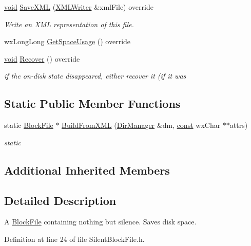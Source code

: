 \begin{DoxyCompactItemize}
\hyperlink{sound_8c_ae35f5844602719cf66324f4de2a658b3}{void} \hyperlink{class_silent_block_file_a9736f23cb10b2270b12064a9c37524b9}{Save\+X\+ML} (\hyperlink{class_x_m_l_writer}{X\+M\+L\+Writer} \&xml\+File) override
\begin{DoxyCompactList}\small\item\em Write an X\+ML representation of this file. \end{DoxyCompactList}\item 
wx\+Long\+Long \hyperlink{class_silent_block_file_a5273837f55e3a5ca86c17a6496015a91}{Get\+Space\+Usage} () override
\item 
\hyperlink{sound_8c_ae35f5844602719cf66324f4de2a658b3}{void} \hyperlink{class_silent_block_file_afbae18ac108b8555c5bfa42f1b99b4d2}{Recover} () override
\begin{DoxyCompactList}\small\item\em if the on-\/disk state disappeared, either recover it (if it was \end{DoxyCompactList}\end{DoxyCompactItemize}
\subsection*{Static Public Member Functions}
\begin{DoxyCompactItemize}
\item 
static \hyperlink{class_block_file}{Block\+File} $\ast$ \hyperlink{class_silent_block_file_a0b97c0fb1472762eb89c5af0fca32e3c}{Build\+From\+X\+ML} (\hyperlink{class_dir_manager}{Dir\+Manager} \&dm, \hyperlink{getopt1_8c_a2c212835823e3c54a8ab6d95c652660e}{const} wx\+Char $\ast$$\ast$attrs)
\begin{DoxyCompactList}\small\item\em static \end{DoxyCompactList}\end{DoxyCompactItemize}
\subsection*{Additional Inherited Members}


\subsection{Detailed Description}
A \hyperlink{class_block_file}{Block\+File} containing nothing but silence. Saves disk space. 

Definition at line 24 of file Silent\+Block\+File.\+h.



